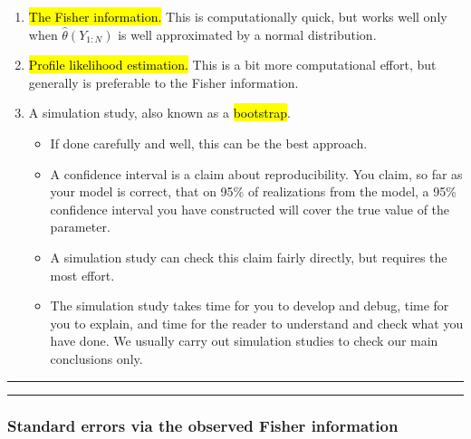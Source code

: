 \documentclass[]{article}
\begin{document}
\begin{enumerate}
\def\labelenumi{\arabic{enumi}.}
\item
  \hl{The Fisher information.} This is computationally quick, but works well
  only when \(\hat\theta(Y_{1:N})\) is well approximated by a normal
  distribution.
\item
  \hl{Profile likelihood estimation.} This is a bit more computational
  effort, but generally is preferable to the Fisher information.
\item
  A simulation study, also known as a \hl{bootstrap}.

  \begin{itemize}
  \item
    If done carefully and well, this can be the best approach.
  \item
    A confidence interval is a claim about reproducibility. You claim,
    so far as your model is correct, that on 95\% of realizations from
    the model, a 95\% confidence interval you have constructed will
    cover the true value of the parameter.
  \item
    A simulation study can check this claim fairly directly, but
    requires the most effort.
  \item
    The simulation study takes time for you to develop and debug, time
    for you to explain, and time for the reader to understand and check
    what you have done. We usually carry out simulation studies to check
    our main conclusions only.
  \end{itemize}
\end{enumerate}

\begin{center}\rule{0.5\linewidth}{\linethickness}\end{center}

\begin{center}\rule{0.5\linewidth}{\linethickness}\end{center}

\subsubsection{Standard errors via the observed Fisher
information}\label{standard-errors-via-the-observed-fisher-information}
\end{document}
